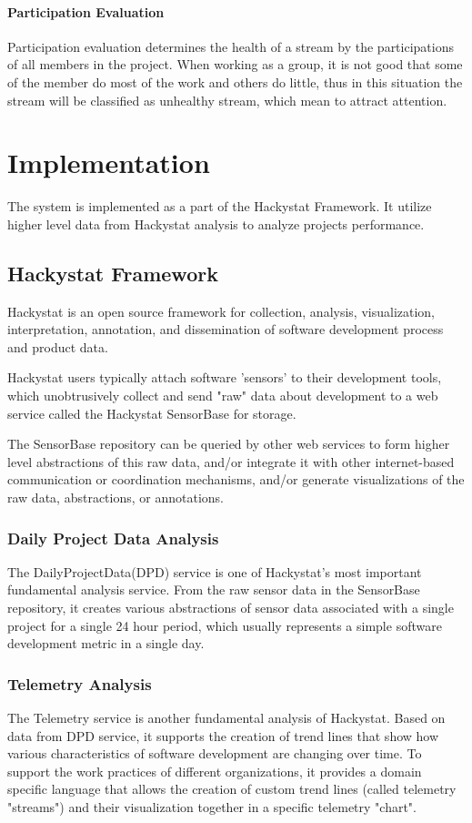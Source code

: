 \subsubsection{Participation Evaluation}
Participation evaluation determines the health of a stream by the participations of all members in the project. When working as a group, it is not good that some of the member do most of the work and others do little, thus in this situation the stream will be classified as unhealthy stream, which mean to attract attention.

\chapter{Implementation}
The system is implemented as a part of the Hackystat Framework. It utilize higher level data from Hackystat analysis to analyze projects performance.

\section{Hackystat Framework}
Hackystat is an open source framework for collection, analysis, visualization, interpretation, annotation, and dissemination of software development process and product data.

Hackystat users typically attach software 'sensors' to their development tools, which unobtrusively collect and send "raw" data about development to a web service called the Hackystat SensorBase for storage.

The SensorBase repository can be queried by other web services to form higher level abstractions of this raw data, and/or integrate it with other internet-based communication or coordination mechanisms, and/or generate visualizations of the raw data, abstractions, or annotations.

\subsection{Daily Project Data Analysis}
The DailyProjectData(DPD) service is one of Hackystat's most important fundamental analysis service. From the raw sensor data in the SensorBase repository, it creates various abstractions of sensor data associated with a single project for a single 24 hour period, which usually represents a simple software development metric in a single day.

\subsection{Telemetry Analysis}
The Telemetry service is another fundamental analysis of Hackystat. Based on data from DPD service, it supports the creation of trend lines that show how various characteristics of software development are changing over time. To support the work practices of different organizations, it provides a domain specific language that allows the creation of custom trend lines (called telemetry "streams") and their visualization together in a specific telemetry "chart". 


